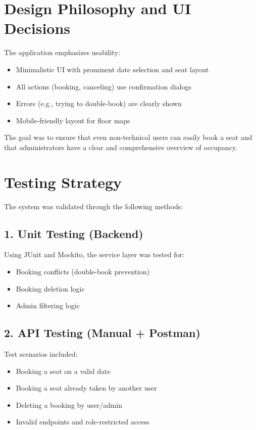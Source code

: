 \documentclass[12pt,a4paper]{report}
\begin{document}
\section{Design Philosophy and UI Decisions}

The application emphasizes usability:
\begin{itemize}
    \item Minimalistic UI with prominent date selection and seat layout
    \item All actions (booking, canceling) use confirmation dialogs
    \item Errors (e.g., trying to double-book) are clearly shown
    \item Mobile-friendly layout for floor maps
\end{itemize}

The goal was to ensure that even non-technical users can easily book a seat and that administrators have a clear and comprehensive overview of occupancy.

\section{Testing Strategy}

The system was validated through the following methods:

\subsection*{1. Unit Testing (Backend)}
Using JUnit and Mockito, the service layer was tested for:
\begin{itemize}
    \item Booking conflicts (double-book prevention)
    \item Booking deletion logic
    \item Admin filtering logic
\end{itemize}

\subsection*{2. API Testing (Manual + Postman)}
Test scenarios included:
\begin{itemize}
    \item Booking a seat on a valid date
    \item Booking a seat already taken by another user
    \item Deleting a booking by user/admin
    \item Invalid endpoints and role-restricted access
\end{itemize}
\end{document}
